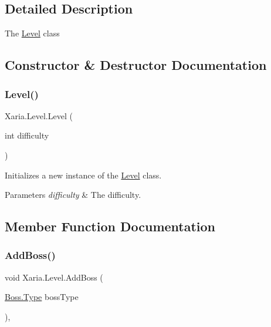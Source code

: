 \subsection{Detailed Description}
The \hyperlink{classXaria_1_1Level}{Level} class 



\subsection{Constructor \& Destructor Documentation}
\mbox{\label{classXaria_1_1Level_abbe8f5dc4eb2b1ea9bb259a4e1440838}} 
\subsubsection{\texorpdfstring{Level()}{Level()}}
{\footnotesize\ttfamily Xaria.\+Level.\+Level (\begin{DoxyParamCaption}\item[{int}]{difficulty }\end{DoxyParamCaption})\hspace{0.3cm}{\ttfamily [inline]}}



Initializes a new instance of the \hyperlink{classXaria_1_1Level}{Level} class. 


\begin{DoxyParams}{Parameters}
{\em difficulty} & The difficulty.\\
\hline
\end{DoxyParams}


\subsection{Member Function Documentation}
\mbox{\label{classXaria_1_1Level_a29b52773008e6b0091a896718d4004b0}} 
\subsubsection{\texorpdfstring{Add\+Boss()}{AddBoss()}}
{\footnotesize\ttfamily void Xaria.\+Level.\+Add\+Boss (\begin{DoxyParamCaption}\item[{\hyperlink{classXaria_1_1Enemies_1_1Boss_ae95ffc3618433440acbfd7aab7671b02}{Boss.\+Type}}]{boss\+Type }\end{DoxyParamCaption})\hspace{0.3cm}{\ttfamily [inline]}, {\ttfamily [private]}}



